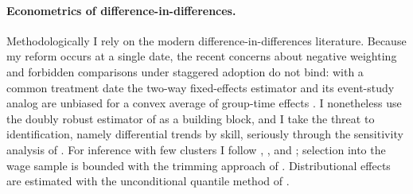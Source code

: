 \paragraph{Econometrics of difference-in-differences.} Methodologically I rely on the
modern difference-in-differences literature. Because my reform occurs at a single
date, the recent concerns about negative weighting and forbidden comparisons under
staggered adoption \citep{goodmanbacon_2021, dechaisemartin_2020, sun_abraham_2021,
callaway_santanna_2021} do not bind: with a common treatment date the two-way
fixed-effects estimator and its event-study analog are unbiased for a convex average
of group-time effects \citep{roth_2023_trending, baker_larcker_wang_2022}. I
nonetheless use the doubly robust estimator of \citet{santanna_zhao_2020} as a
building block, and I take the threat to identification, namely differential trends
by skill, seriously through the sensitivity analysis of \citet{rambachan_roth_2023}.
For inference with few clusters I follow \citet{bertrand_2004},
\citet{cameron_2008_bootstrap}, and \citet{pustejovsky_tipton_2018}; selection into
the wage sample is bounded with the trimming approach of \citet{lee_2009}.
Distributional effects are estimated with the unconditional quantile method of
\citet{firpo_fortin_lemieux_2009}.
